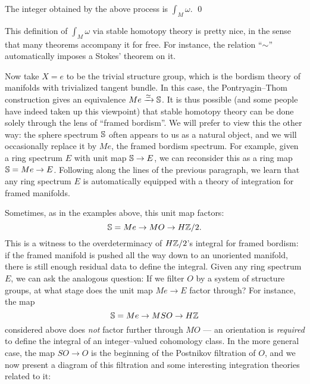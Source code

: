 \begin{lemma}
The integer obtained by the above process is $\int_M \omega$. \qed
\end{lemma}

\noindent This definition of $\int_M \omega$ via stable homotopy theory is pretty nice, in the sense that many theorems accompany it for free.  For instance, the relation ``$\sim$'' automatically imposes a Stokes' theorem on it.

Now take $X = e$ to be the trivial structure group, which is the bordism theory of manifolds with trivialized tangent bundle.  In this case, the Pontryagin--Thom construction gives an equivalence $Me \xrightarrow{\simeq} \S$.  It is thus possible (and some people have indeed taken up this viewpoint) that stable homotopy theory can be done solely through the lens of ``framed bordism''.  We will prefer to view this the other way: the sphere spectrum $\S$ often appears to us as a natural object, and we will occasionally replace it by $Me$, the framed bordism spectrum.  For example, given a ring spectrum $E$ with unit map $\S \to E$, we can reconsider this as a ring map $\S = Me \to E$.  Following along the lines of the previous paragraph, we learn that any ring spectrum $E$ is automatically equipped with a theory of integration for framed manifolds.

Sometimes, as in the examples above, this unit map factors: \[\S = Me \to MO \to H\Z/2.\]  This is a witness to the overdeterminacy of $H\Z/2$'s integral for framed bordism: if the framed manifold is pushed all the way down to an unoriented manifold, there is still enough residual data to define the integral.  Given any ring spectrum $E$, we can ask the analogous question: If we filter $O$ by a system of structure groups, at what stage does the unit map $Me \to E$ factor through?  For instance, the map \[\S = Me \to MSO \to H\Z\] considered above does \emph{not} factor further through $MO$ --- an orientation is \emph{required} to define the integral of an integer--valued cohomology class.  In the more general case, the map $SO \to O$ is the beginning of the Postnikov filtration of $O$,  and we now present a diagram of this filtration and some interesting integration theories related to it:
\begin{center}
\end{center}

